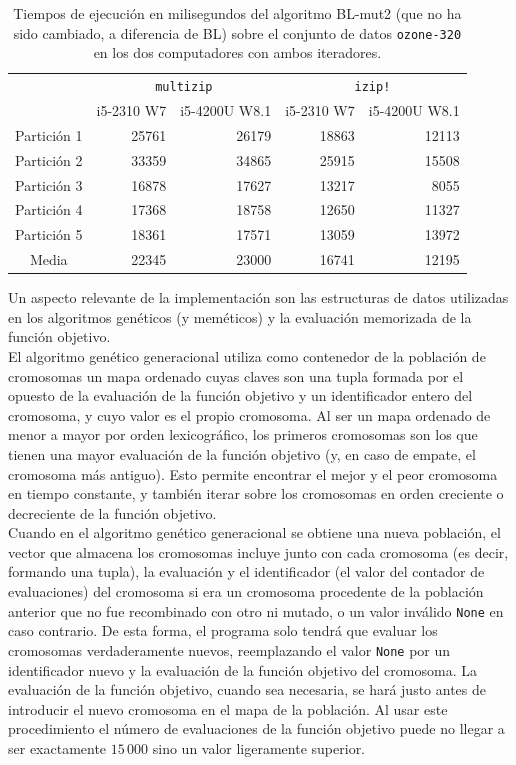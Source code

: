 \documentclass{article}
\begin{document}
\begin{table}[H]
	\centering
	\def\arraystretch{1.27}
	\begin{tabular}{c r r r r}
	\cline{2-5}
	 & \multicolumn{2}{c}{\texttt{multizip}} & \multicolumn{2}{c}{\texttt{izip!}} \\
	 & i5-2310 W7 & i5-4200U W8.1 & i5-2310 W7 & i5-4200U W8.1 \\
		\hline
		Partición 1 & 25761 & 26179 & 18863 & 12113 \\
		Partición 2 & 33359 & 34865 & 25915 & 15508 \\
		Partición 3 & 16878 & 17627 & 13217 &  8055 \\
		Partición 4 & 17368 & 18758 & 12650 & 11327 \\
		Partición 5 & 18361 & 17571 & 13059 & 13972 \\
		\hline
		Media       & 22345 & 23000 & 16741 & 12195 \\
	\end{tabular}
	\caption{Tiempos de ejecución en milisegundos del algoritmo BL-mut2 (que no ha sido cambiado, a diferencia de BL) sobre el conjunto de datos \texttt{ozone-320} en los dos computadores con ambos iteradores.}
\end{table}

Un aspecto relevante de la implementación son las estructuras de datos utilizadas en los algoritmos genéticos (y meméticos) y la evaluación memorizada de la función objetivo. \\

El algoritmo genético generacional utiliza como contenedor de la población de cromosomas un mapa ordenado cuyas claves son una tupla formada por el opuesto de la evaluación de la función objetivo y un identificador entero del cromosoma, y cuyo valor es el propio cromosoma. Al ser un mapa ordenado de menor a mayor por orden lexicográfico, los primeros cromosomas son los que tienen una mayor evaluación de la función objetivo (y, en caso de empate, el cromosoma más antiguo). Esto permite encontrar el mejor y el peor cromosoma en tiempo constante, y también iterar sobre los cromosomas en orden creciente o decreciente de la función objetivo. \\

Cuando en el algoritmo genético generacional se obtiene una nueva población, el vector que almacena los cromosomas incluye junto con cada cromosoma (es decir, formando una tupla), la evaluación y el identificador (el valor del contador de evaluaciones) del cromosoma si era un cromosoma procedente de la población anterior que no fue recombinado con otro ni mutado, o un valor inválido \texttt{None} en caso contrario. De esta forma, el programa solo tendrá que evaluar los cromosomas verdaderamente nuevos, reemplazando el valor \texttt{None} por un identificador nuevo y la evaluación de la función objetivo del cromosoma. La evaluación de la función objetivo, cuando sea necesaria, se hará justo antes de introducir el nuevo cromosoma en el mapa de la población. Al usar este procedimiento el número de evaluaciones de la función objetivo puede no llegar a ser exactamente $15\,000$ sino un valor ligeramente superior. \\
\end{document}
